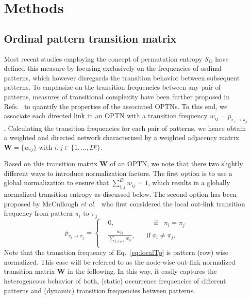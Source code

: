 \documentclass[12pt,aip,cha,reprint,nofootinbib]{revtex4-1}
\begin{document}
\section{Methods} \label{sec:methods}

\subsection{Ordinal pattern transition matrix} \label{sec:OPW}

Most recent studies employing the concept of permutation entropy $\mathcal{S}_O$ have defined this measure by focusing exclusively on the frequencies of ordinal patterns, which however disregards the transition behavior between subsequent patterns. To emphasize on the transition frequencies between any pair of patterns, measures of transitional complexity have been further proposed in Refs.~\cite{zhangSciRep2017,McCullough2017b} to quantify the properties of the associated OPTNs. To this end, we associate each directed link in an OPTN with a transition frequency $w_{ij} = p_{\pi_i \to \pi_j}$. Calculating the transition frequencies for each pair of patterns, we hence obtain a weighted and directed network characterized by a weighted adjacency matrix $\mathbf{W} = \{ w_{ij} \}$ with $i, j \in \{1,\ldots, D!\}$. 

Based on this transition matrix $\mathbf{W}$ of an OPTN, we note that there two slightly different ways to introduce normalization factors. The first option \cite{zhangSciRep2017} is to use a global normalization to ensure that $\sum_{i,j}^{D!} w_{ij} = 1$, which results in a globally normalized transition entropy as discussed below. The second option has been proposed by McCullough {\textit{et al.}}~\cite{McCullough2017b} who first considered the local out-link transition frequency from pattern $\pi_i$ to $\pi_j$
\begin{equation} \label{eq:localTp}
p_{\pi_i \to \pi_j} = \left \{ \begin{aligned}
				& 0,  \;\;\;\;\;\;\;\;\;\;\;\;\;\;\;\;\;\;\;\;\; \text{if} \;\;\; \pi_i = \pi_j \\
				& \frac{w_{ij}}{\sum_{j, j \neq i} w_{ij}}, \;\;\;\;\;\; \text{if} \; \pi_i \neq \pi_j.\\
				\end{aligned}
				\right.
\end{equation}
\noindent
Note that the transition frequency of Eq.~\eqref{eq:localTp} is pattern (row) wise normalized. This case will be referred to as the node-wise out-link normalized transition matrix $\mathbf{W}$ in the following. In this way, it easily captures the heterogeneous behavior of both, (static) occurrence frequencies of different patterns and (dynamic) transition frequencies between patterns. 
\end{document}
